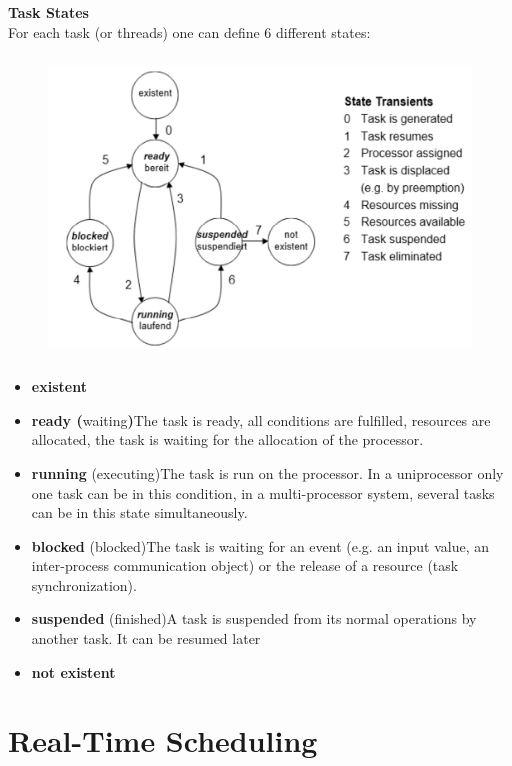 {\rot\bf Task States}\\

For each task (or threads) one can define 6 different states:

	\begin{figure}[h]
    \centering
    \includegraphics[width=13cm, height=8cm]{Images/image82.png}
    \label{fig:Fig 28}
    \end{figure}

\begin{itemize}
	\item  \textbf{existent}
	\item \textbf{ ready (}waiting\textbf{)}The task is ready, all conditions are fulfilled, resources are allocated, the task is waiting for the allocation of the processor.
	\item  \textbf{running }(executing)The task is run on the processor. In a uniprocessor only one task can be in this condition, in a multi-processor system, several tasks can be in this state simultaneously. 
	\item  \textbf{blocked} (blocked)The task is waiting for an event (e.g. an input value, an inter-process communication object) or the release of a resource (task synchronization). 
	\item  \textbf{suspended }(finished)A task is suspended from its normal operations by another task. It can be resumed later
	\item  \textbf{not existent}
\end{itemize}

\section{Real-Time Scheduling}

